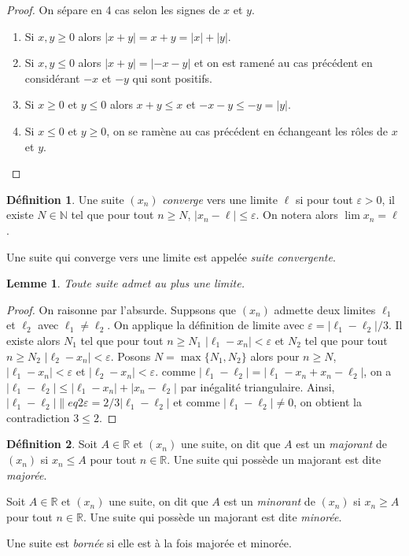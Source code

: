 \documentclass[
]{book}
\providecommand{\tightlist}{%
  \setlength{\itemsep}{0pt}\setlength{\parskip}{0pt}}
\newtheorem{lemma}{Lemme}[chapter]
\theoremstyle{definition}
\newtheorem{definition}{Définition}[chapter]
\theoremstyle{definition}
\theoremstyle{definition}
\theoremstyle{definition}
\theoremstyle{remark}
\begin{document}
\begin{proof}

On sépare en 4 cas selon les signes de \(x\) et \(y\).

\begin{enumerate}
\def\labelenumi{\arabic{enumi}.}
\tightlist
\item
  Si \(x,y\geq0\) alors \(|x+y|=x+y=|x|+|y|\).
\item
  Si \(x,y\leq0\) alors \(|x+y|=|-x-y|\) et on est ramené au cas précédent en considérant \(-x\) et \(-y\) qui sont positifs.
\item
  Si \(x\geq0\) et \(y\leq0\) alors \(x+y\leq x\) et \(-x-y \leq -y=|y|\).
\item
  Si \(x\leq0\) et \(y\geq0\), on se ramène au cas précédent en échangeant les rôles de \(x\) et \(y\).
\end{enumerate}

\end{proof}

\begin{definition}
Une suite \((x_n)\) \emph{converge} vers une limite \(\ell\) si pour tout \(\varepsilon>0\), il existe \(N\in\mathbb{N}\) tel que pour tout \(n\geq N\), \(|x_n-\ell|\leq\varepsilon\). On notera alors \(\lim x_n=\ell\).

Une suite qui converge vers une limite est appelée \emph{suite convergente}.
\end{definition}

\begin{lemma}
Toute suite admet au plus une limite.
\end{lemma}

\begin{proof}
On raisonne par l'absurde. Suppsons que \((x_n)\) admette deux limites \(\ell_1\) et \(\ell_2\) avec \(\ell_1\neq\ell_2\). On applique la définition de limite avec \(\varepsilon=|\ell_1-\ell_2|/3\). Il existe alors \(N_1\) tel que pour tout \(n\geq N_1\) \(|\ell_1-x_n|<\varepsilon\) et \(N_2\) tel que pour tout \(n\geq N_2\) \(|\ell_2-x_n|<\varepsilon\). Posons \(N=\max\{N_1,N_2\}\) alors pour \(n\geq N\), \(|\ell_1-x_n|<\varepsilon\) et \(|\ell_2-x_n|<\varepsilon\). comme \(|\ell_1-\ell_2|=|\ell_1-x_n+x_n-\ell_2|\), on a \(|\ell_1-\ell_2|\leq|\ell_1-x_n|+|x_n-\ell_2|\) par inégalité triangulaire. Ainsi, \(|\ell_1-\ell_2|\|eq2\varepsilon=2/3|\ell_1-\ell_2|\) et comme \(|\ell_1-\ell_2|\neq0\), on obtient la contradiction \(3\leq2\).
\end{proof}

\begin{definition}
Soit \(A\in\mathbb{R}\) et \((x_n)\) une suite, on dit que \(A\) est un \emph{majorant} de \((x_n)\) si \(x_n\leq A\) pour tout \(n\in\mathbb{R}\). Une suite qui possède un majorant est dite \emph{majorée}.

Soit \(A\in\mathbb{R}\) et \((x_n)\) une suite, on dit que \(A\) est un \emph{minorant} de \((x_n)\) si \(x_n\geq A\) pour tout \(n\in\mathbb{R}\). Une suite qui possède un majorant est dite \emph{minorée}.

Une suite est \emph{bornée} si elle est à la fois majorée et minorée.
\end{definition}
\end{document}
